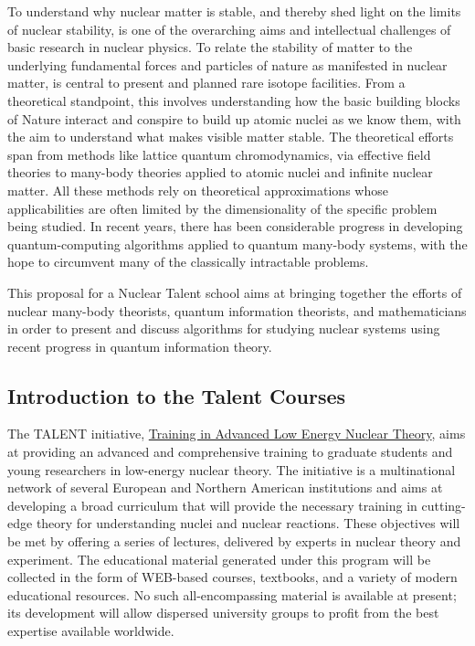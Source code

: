 \documentclass[twocolumn,superscriptaddress,amsmath,amssymb,
aps,floatfix]{revtex4-2}
\begin{document}
To understand why nuclear matter is stable, and thereby shed light on
the limits of nuclear stability, is one of the overarching aims and
intellectual challenges of basic research in nuclear physics. To relate
the stability of matter to the underlying fundamental forces and
particles of nature as manifested in nuclear matter, is central to
present and planned rare isotope facilities. From a theoretical
standpoint, this involves understanding how the basic building blocks of
Nature interact and conspire to build up atomic nuclei as we know them,
with the aim to understand what makes visible matter stable. The
theoretical efforts span from methods like lattice quantum
chromodynamics, via effective field theories to many-body theories
applied to atomic nuclei and infinite nuclear matter. All these methods
rely on theoretical approximations whose applicabilities are often
limited by the dimensionality of the specific problem being studied. In
recent years, there has been considerable progress in 
developing quantum-computing algorithms
applied to quantum many-body systems, with the hope to circumvent many of the 
classically intractable problems.

This proposal for a Nuclear Talent school aims at bringing together the
efforts of nuclear many-body theorists, quantum information theorists,
and mathematicians in order to present and discuss algorithms for
studying nuclear systems using recent progress in quantum information
theory.

    \subsection{Introduction to the Talent
Courses}\label{introduction-to-the-talent-courses}

The TALENT initiative, \href{http://www.nucleartalent.org}{Training in
Advanced Low Energy Nuclear Theory}, aims at providing an advanced and
comprehensive training to graduate students and young researchers in
low-energy nuclear theory. The initiative is a multinational network
of several European and Northern American institutions and aims at
developing a broad curriculum that will provide %
the necessary training in cutting-edge theory for understanding nuclei and nuclear reactions.
These objectives will be met by offering a series of lectures,
delivered by 
experts in nuclear theory and experiment.
The educational material generated under this program will be collected
in the form of WEB-based courses, textbooks, and a variety of modern
educational resources. No such all-encompassing material is available at
present; its development will allow dispersed university groups to
profit from the best expertise available worldwide.
\end{document}
